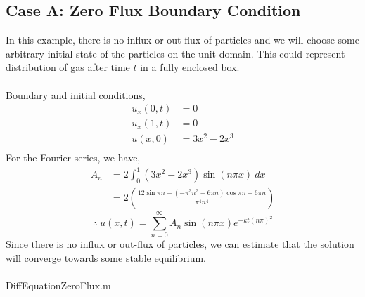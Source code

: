 \documentclass{article}
\begin{document}
\subsection{Case A: Zero Flux Boundary Condition}
In this example, there is no influx or out-flux of particles and we will choose some arbitrary initial state of the particles on the unit domain. This could represent distribution of gas after time $t$ in a fully enclosed box.
\\
\\
\noindent Boundary and initial conditions,
\[
	\begin{split}
		u_x(0,t) &= 0 \\
		u_x(1,t) &= 0 \\
		u(x,0) &= 3x^2-2x^3 \\
	\end{split}
\]
For the Fourier series, we have,
\[
	\begin{split}
		A_n &= 2\int_{0}^{1} (3x^2-2x^3)\sin{\left(n\pi x\right)} \ dx \\
		&= 2\left(\frac{12\sin{\pi n}+(-\pi^3n^3-6\pi n)\cos{\pi n}-6\pi n}{\pi^4n^4}\right)
	\end{split}
\]
\[
	\therefore \ u(x,t) = \sum^{\infty}_{n=0} A_n\sin{\left(n\pi x\right)}e^{-kt\left(n\pi\right)^2}
\]
Since there is no influx or out-flux of particles, we can estimate that the solution will converge towards some stable equilibrium.
\\
\\
\noindent DiffEquationZeroFlux.m
\end{document}
